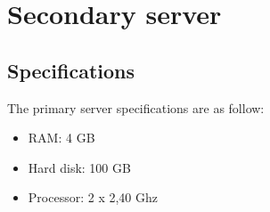 \section {Secondary server}
\subsection {Specifications}
The primary server specifications are as follow:
\begin{itemize}
  \item RAM: 4 GB
  \item Hard disk: 100 GB
  \item Processor: 2 x 2,40 Ghz
\end{itemize}





